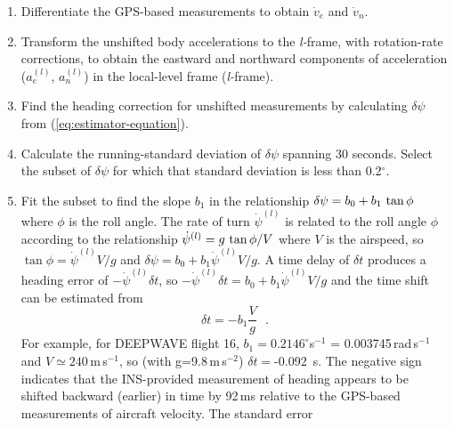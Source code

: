 \documentclass[12pt,twoside,english,12pt,twoside,english]{article}\usepackage[]{graphicx}\usepackage[]{color}
\let\OrgIndex\index
\renewcommand*{\index}[1]{\OrgIndex{#1}}
\begin{document}
\begin{enumerate}
\item Differentiate the GPS-based
measurements to obtain $\dot{v}_{e}$
and $\dot{v}_{n}$.
\item Transform the unshifted body
accelerations  to the \emph{l-}frame,
with rotation-rate corrections, to obtain
the eastward and northward components of acceleration ($a_{e}^{(l)}$,
$a_{n}^{(l)}$) in the local-level frame (\emph{l-}frame). 
\item Find the heading correction for unshifted
measurements by calculating $\delta\psi$ from (\ref{eq:estimator-equation}).
\item Calculate the running-standard deviation
of $\delta\psi$ spanning 30 seconds. Select the subset of $\delta\psi$
for which that standard deviation is less than 0.2$^{\circ}$.
\item Fit the subset to find the slope
$b_{1}$ in the relationship $\delta\psi=b_{0}+b_{1}\thinspace\tan\phi$
where $\phi$ is the roll angle. The rate of turn $\dot{\psi}^{(l)}$
is related to the roll angle $\phi$ according to the relationship
$\dot{\psi}^{(l)}=g\thinspace\tan\phi/V$ where $V$ is the airspeed,
so $\tan\phi=\dot{\psi}^{(l)}V/g$ and $\delta\psi=b_{0}+b_{1}\dot{\psi}^{(l)}V/g$.
A time delay of $\delta t$ produces a heading error
of $-\dot{\psi}^{(l)}\delta t$, so $-\dot{\psi}^{(l)}\delta t=b_{0}+b_{1}\dot{\psi}^{(l)}V/g$
and the time shift can be estimated from\\
\begin{equation}
\delta t=-b_{1}\frac{V}{g}\,\,\,\,.\label{eq:deltaT}
\end{equation}
For example, for DEEPWAVE flight
16, $b_{1}=0.2146^{\circ}$s$^{-1}$ = 0.003745\,rad\,s$^{-1}$
and $V\simeq240$\,m\,s$^{-1}$, so (with g=9.8\,m\,s$^{-2}$)
$\delta t=$-0.092~s. The negative sign indicates that the INS-provided
measurement of heading appears to be shifted backward (earlier) in
time by 92\,ms relative to the GPS-based measurements
of aircraft velocity. The standard error

\end{enumerate}
\end{document}
